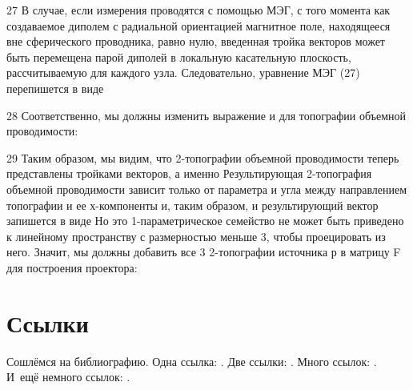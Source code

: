 27
В случае, если измерения проводятся с помощью МЭГ, с того момента как создаваемое диполем с радиальной ориентацией магнитное поле, находящееся вне сферического проводника, равно нулю, введенная тройка векторов может быть перемещена парой диполей в локальную касательную плоскость, рассчитываемую для каждого узла. Следовательно, уравнение МЭГ (27) перепишется в виде

28
Соответственно, мы должны изменить выражение и для топографии объемной проводимости:

29
Таким образом, мы видим, что 2-топографии объемной проводимости теперь представлены тройками векторов, а именно Результирующая 2-топография объемной проводимости зависит только от параметра  и угла между направлением топографии и ее х-компоненты и, таким образом, и результирующий вектор запишется в виде
Но это 1-параметрическое семейство не может быть приведено к линейному пространству с размерностью меньше 3, чтобы проецировать из него. Значит, мы должны добавить все 3 2-топографии источника р в матрицу F для построения проектора:

\section{Ссылки} \label{sect1_2}
Сошлёмся на библиографию.
Одна ссылка: \cite[с.~54]{Sokolov}\cite[с.~36]{Gaidaenko}.
Две ссылки: \cite{Sokolov,Gaidaenko}.
Много ссылок: %
\cite{Lermontov,Management,Borozda,Marketing,Constitution,FamilyCode,Gost.7.0.53,Razumovski,Lagkueva,Pokrovski,Sirotko,Lukina,Methodology,Encyclopedia,Nasirova,Berestova,Kriger}.
И~ещё немного ссылок:
\cite{Article,Book,Booklet,Conference,Inbook,Incollection,Manual,Mastersthesis,Misc,Phdthesis,Proceedings,Techreport,Unpublished}.
\cite{medvedev2006jelektronnye, CEAT:CEAT581, doi:10.1080/01932691.2010.513279,Gosele1999161,Li2007StressAnalysis, Shoji199895,test:eisner-sample,AB_patent_Pomerantz_1968,iofis_patent1960}



